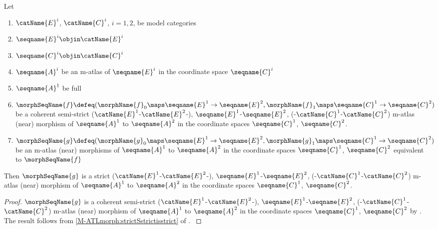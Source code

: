 \documentclass{article}
\begin{document}
\begin{corollary}
\label{cor:M-ATLmorphequiv}
Let
\begin{enumerate}
\item
$\catName{E}^i$, $\catName{C}^i$, $i=1,2$, be model categories
\item
$\seqname{E}^i \objin \catName{E}^i$
\item
$\seqname{C}^i \objin \catName{C}^i$
\item
$\seqname{A}^i$ be an m-atlas of $\seqname{E}^i$ in the coordinate space
$\seqname{C}^i$
\item
$\seqname{A}^1$ be full
\item
$
  \morphSeqName{f} \defeq
  (
    \morphName{f}_0 \maps \seqname{E}^1 \to \seqname{E}^2,
    \morphName{f}_1 \maps \seqname{C}^1 \to \seqname{C}^2
  )
$
be a coherent semi-strict
\nobreaks
  {
    {($\catName{E}^1$-$\catName{E}^2$-)},
    {$\seqname{E}^1$-$\seqname{E}^2$},
    {(-$\catName{C}^1$-$\catName{C}^2$)}
  }
m-atlas (near) morphism of $\seqname{A}^1$ to $\seqname{A}^2$ in the
coordinate spaces $\seqname{C}^1$, $\seqname{C}^2$.
\item
$
  \morphSeqName{g} \defeq
  (
    \morphName{g}_0 \maps \seqname{E}^1 \to \seqname{E}^2,
    \morphName{g}_1 \maps \seqname{C}^1 \to \seqname{C}^2
  )
$
be an m-atlas (near) morphisms of $\seqname{A}^1$ to $\seqname{A}^2$ in
the coordinate spaces $\seqname{C}^1$, $\seqname{C}^2$ equivalent to
$\morphSeqName{f}$
\end{enumerate}

Then $\morphSeqName{g}$ is a strict
\nobreaks
  {
    {($\catName{E}^1$-$\catName{E}^2$-)},
    {$\seqname{E}^1$-$\seqname{E}^2$},
    {(-$\catName{C}^1$-$\catName{C}^2$)}
  }
m-atlas (near) morphism of $\seqname{A}^1$ to $\seqname{A}^2$ in the
coordinate spaces $\seqname{C}^1$, $\seqname{C}^2$.

\begin{proof}
$\morphSeqName{g}$ is a coherent semi-strict
\nobreaks
  {
    {($\catName{E}^1$-$\catName{E}^2$-)},
    {$\seqname{E}^1$-$\seqname{E}^2$},
    {(-$\catName{C}^1$-$\catName{C}^2$)}
  }
m-atlas (near) morphism of $\seqname{A}^1$ to $\seqname{A}^2$ in the
coordinate spaces $\seqname{C}^1$, $\seqname{C}^2$ by
.
The result follows from \cref{M-ATLmorph:strictSstrictisstrict} of
{
  \showlabelsinline
  .
}
\end{proof}
\end{corollary}
\end{document}
